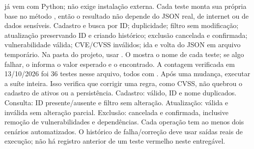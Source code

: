 
  já vem com Python; não exige instalação externa. Cada teste monta sua própria base no método , então o resultado não depende do JSON real, de internet ou de dados sensíveis.
 Cadastro e busca por ID; duplicidade; filtro sem modificação; atualização preservando ID e criando histórico; exclusão cancelada e confirmada; vulnerabilidade válida; CVE/CVSS inválidos; ida e volta do JSON em arquivo temporário.
 Na pasta do projeto, usar . O  mostra o nome de cada teste; se algo falhar, o  informa o valor esperado e o encontrado. A contagem verificada em 13/10/2026 foi 36 testes nesse arquivo, todos com .
 Após uma mudança, executar a suíte inteira. Isso verifica que corrigir uma regra, como CVSS, não quebrou o cadastro de ativos ou a persistência.
 Cadastro: válido, ID e nome duplicados. Consulta: ID presente/ausente e filtro sem alteração. Atualização: válida e inválida sem alteração parcial. Exclusão: cancelada e confirmada, inclusive remoção de vulnerabilidades e dependências. Cada operação tem ao menos dois cenários automatizados. O histórico de falha/correção deve usar saídas reais de execução; não há registro anterior de um teste vermelho neste entregável.


